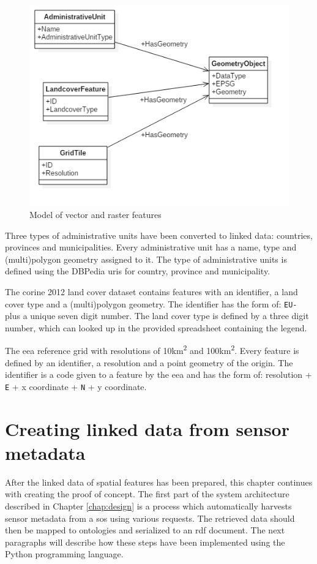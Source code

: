 \begin{figure}
	\includegraphics[width=0.7\linewidth]{UML/staticdata2.PNG}
	\caption{Model of vector and raster features}
	\label{fig:Static}
\end{figure}

Three types of administrative units have been converted to linked data: countries, provinces and municipalities. Every administrative unit has a name, type and (multi)polygon geometry assigned to it. The type of administrative units is defined using the DBPedia \ac{uri}s for country, province and municipality. 

The \ac{corine} 2012 land cover dataset contains features with an identifier, a land cover type and a (multi)polygon geometry. The identifier has the form of: \texttt{EU-} plus a unique seven digit number. The land cover type is defined by a three digit number, which can looked up in the provided spreadsheet containing the legend.    

The \ac{eea} reference grid with resolutions of 10km\textsuperscript{2} and 100km\textsuperscript{2}. Every feature is defined by an identifier, a resolution and a point geometry of the origin. The identifier is a code given to a feature by the \ac{eea} and has the form of: resolution + \texttt{E} + x coordinate + \texttt{N} + y coordinate.  


\section{Creating linked data from sensor metadata}
\label{par:linkedSD}
After the linked data of spatial features has been prepared, this chapter continues with creating the proof of concept. The first part of the system architecture described in Chapter \ref{chap:design} is a process which automatically harvests sensor metadata from a \ac{sos} using various requests. The retrieved data should then be mapped to ontologies and serialized to an \ac{rdf} document. The next paragraphs will describe how these steps have been implemented using the Python programming language.

